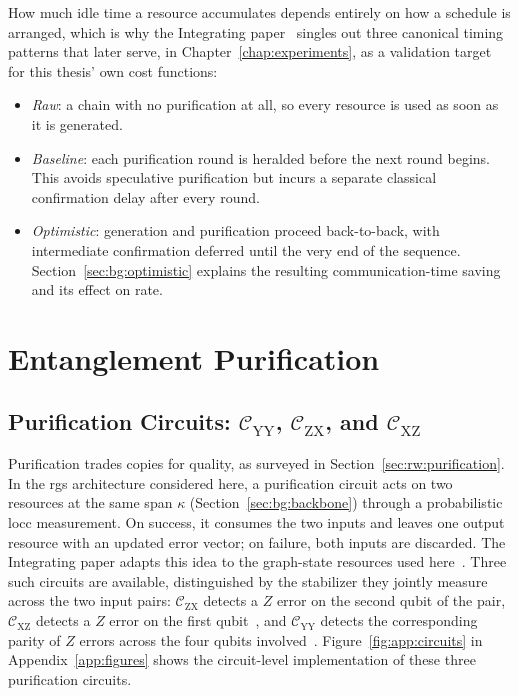 How much idle time a resource accumulates depends entirely on how a schedule is arranged, which is why the Integrating paper~\cite{Benchasattabuse2025Integrating} singles out three canonical timing patterns that later serve, in Chapter~\ref{chap:experiments}, as a validation target for this thesis' own cost functions:

\begin{itemize}
    \item \emph{Raw}: a chain with no purification at all, so every resource is used as soon as it is generated.
    \item \emph{Baseline}: each purification round is heralded before the next round begins. This avoids speculative purification but incurs a separate classical confirmation delay after every round.
    \item \emph{Optimistic}: generation and purification proceed back-to-back, with intermediate confirmation deferred until the very end of the sequence. Section~\ref{sec:bg:optimistic} explains the resulting communication-time saving and its effect on rate.
\end{itemize}

\section{Entanglement Purification}
\label{sec:bg:purification}

\subsection{Purification Circuits: \texorpdfstring{$\mathcal C_\mathrm{YY}$, $\mathcal C_\mathrm{ZX}$, and $\mathcal C_\mathrm{XZ}$}{CYY, CZX, and CXZ}}
\label{sec:bg:circuits}

Purification trades copies for quality, as surveyed in Section~\ref{sec:rw:purification}. In the \Gls{rgs} architecture considered here, a purification circuit acts on two resources at the same span $\kappa$ (Section~\ref{sec:bg:backbone}) through a probabilistic \gls{locc} measurement. On success, it consumes the two inputs and leaves one output resource with an updated error vector; on failure, both inputs are discarded. The Integrating paper adapts this idea to the graph-state resources used here~\cite{Benchasattabuse2025Integrating}. Three such circuits are available, distinguished by the stabilizer they jointly measure across the two input pairs: $\mathcal C_\mathrm{ZX}$ detects a $Z$ error on the second qubit of the pair, $\mathcal C_\mathrm{XZ}$ detects a $Z$ error on the first qubit~\cite{Deutsch1996Quantum,Bennett1996Purification}, and $\mathcal C_\mathrm{YY}$ detects the corresponding parity of $Z$ errors across the four qubits involved~\cite{Benchasattabuse2025Integrating}. Figure~\ref{fig:app:circuits} in Appendix~\ref{app:figures} shows the circuit-level implementation of these three purification circuits.

